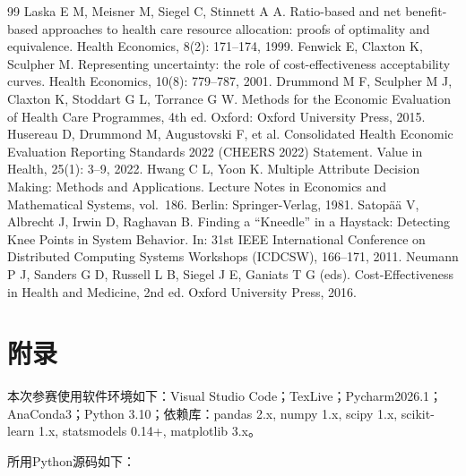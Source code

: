 \documentclass{MathorCupmodeling}
\begin{document}
\begin{thebibliography}{99}
 Laska E M, Meisner M, Siegel C, Stinnett A A. Ratio-based and net benefit-based approaches to health care resource allocation: proofs of optimality and equivalence. Health Economics, 8(2): 171--174, 1999.
 Fenwick E, Claxton K, Sculpher M. Representing uncertainty: the role of cost-effectiveness acceptability curves. Health Economics, 10(8): 779--787, 2001.
 Drummond M F, Sculpher M J, Claxton K, Stoddart G L, Torrance G W. Methods for the Economic Evaluation of Health Care Programmes, 4th ed. Oxford: Oxford University Press, 2015.
 Husereau D, Drummond M, Augustovski F, et al. Consolidated Health Economic Evaluation Reporting Standards 2022 (CHEERS 2022) Statement. Value in Health, 25(1): 3--9, 2022.
 Hwang C L, Yoon K. Multiple Attribute Decision Making: Methods and Applications. Lecture Notes in Economics and Mathematical Systems, vol.~186. Berlin: Springer-Verlag, 1981.
 Satopää V, Albrecht J, Irwin D, Raghavan B. Finding a ``Kneedle'' in a Haystack: Detecting Knee Points in System Behavior. In: 31st IEEE International Conference on Distributed Computing Systems Workshops (ICDCSW), 166--171, 2011.
 Neumann P J, Sanders G D, Russell L B, Siegel J E, Ganiats T G (eds). Cost-Effectiveness in Health and Medicine, 2nd ed. Oxford University Press, 2016.
\end{thebibliography}


\appendix
\section{附录}

本次参赛使用软件环境如下：Visual Studio Code；TexLive；Pycharm2026.1；AnaConda3；Python 3.10；依赖库：pandas 2.x, numpy 1.x, scipy 1.x, scikit-learn 1.x, statsmodels 0.14+, matplotlib 3.x。

所用Python源码如下：

\begingroup
{}





\endgroup
\end{document}
